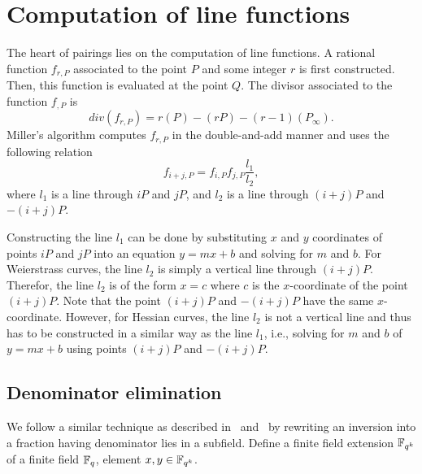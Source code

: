 \section{Computation of line functions}

The heart of pairings lies on the computation of line functions.
A rational function $f_{r,P}$ associated to the point $P$ and some integer $r$
is first constructed.
Then, this function is evaluated at the point $Q$.
The divisor associated to the function $f_{,P}$ is
$$ div(f_{r,P}) = r(P) - (rP) - (r-1)(P_\infty). $$
Miller's algorithm computes $f_{r,P}$ in the double-and-add manner
and uses the following relation
$$ f_{i+j,P} = f_{i,P} f_{j,P} \frac{l_1}{l_2}, $$
where $l_1$ is a line through $iP$ and $jP$,
and $l_2$ is a line through $(i+j)P$ and $-(i+j)P$.

Constructing the line $l_1$ can be done by substituting $x$ and $y$ coordinates of points $iP$ and $jP$
into an equation $y = mx + b$ and solving for $m$ and $b$.
For Weierstrass curves, the line $l_2$ is simply a vertical line through $(i+j)P$.
Therefor, the line $l_2$ is of the form $x = c$ where $c$ is the $x$-coordinate of the point $(i+j)P$.
Note that the point $(i+j)P$ and $-(i+j)P$ have the same $x$-coordinate.
However, for Hessian curves, the line $l_2$ is not a vertical line
and thus has to be constructed in a similar way as the line $l_1$,
i.e., solving for $m$ and $b$ of $y = mx + b$ using points $(i+j)P$ and $-(i+j)P$.



\subsection{Denominator elimination}
We follow a similar technique as described in~\cite{2008/lin} and~\cite{2009/deg15}
by rewriting an inversion into a fraction having denominator lies in a subfield.
Define a finite field extension $\mathbb{F}_{q^k}$ of a finite field $\mathbb{F}_{q}$,
element $x,y \in \mathbb{F}_{q^k}$.


